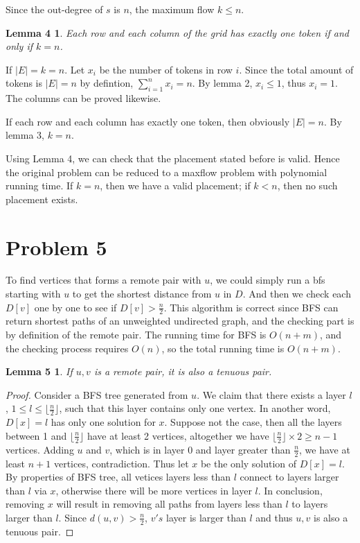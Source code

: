 \documentclass{report}
\def\floor#1{\lfloor{} #1 \rfloor{}}
\begin{document}
    Since the out-degree of $s$ is $n$, the maximum flow $k \le n$.
    \newtheorem*{l4}{Lemma 4}
    \begin{l4}
        Each row and each column of the grid has exactly one token if and only if $k = n$.
    \end{l4}
    If $|E| = k = n$. Let $x_i$ be the number of tokens in row $i$. Since the total amount
    of tokens is $|E| = n$ by defintion, $\sum_{i=1}^n x_i = n$. By lemma 2, $x_i \le 1$,
    thus $x_i = 1$. The columns can be proved likewise.

    If each row and each column has exactly one token, then obviously $|E| = n$. By lemma 3,
    $k = n$. 

    Using Lemma 4, we can check that the placement stated before is valid. Hence the 
    original problem can be reduced to a maxflow problem with polynomial running time.
    If $k = n$, then we have a valid placement; if $k < n$, then no such placement exists.

    \section*{Problem 5}
    To find vertices that forms a remote pair with $u$, we could simply run a bfs starting
    with $u$ to get the shortest distance from $u$ in $D$. And then we check each $D[v]$ 
    one by one to see if $D[v] > \frac{n}{2}$. This algorithm is correct since BFS can 
    return shortest paths of an unweighted undirected graph, and the checking part is by 
    definition of the remote pair. The running time for BFS is $O(n+m)$, and the checking 
    process requires $O(n)$, so the total running time is $O(n+m)$.

    \newtheorem*{l5}{Lemma 5}
    \begin{l5}
        If $u, v$ is a remote pair, it is also a tenuous pair.
    \end{l5}

    \begin{proof}
        Consider a BFS tree generated from $u$. We claim that there exists a layer $l$, 
        $1 \le l \le \floor{\frac{n}{2}}$, such that this layer contains only one vertex. 
        In another word, $D[x] = l$ has only one solution for $x$. Suppose not the case,
        then all the layers between 1 and $\floor{\frac{n}{2}}$ have at least 2 vertices, 
        altogether we have $\floor{\frac{n}{2}} \times 2 \ge n-1$ vertices. Adding $u$ and
        $v$, which is in layer 0 and layer greater than $\frac{n}{2}$,
        we have at least $n+1$ vertices, contradiction. Thus let $x$ be the only
        solution of $D[x] = l$. By properties of BFS tree, all vetices layers less than $l$ 
        connect to layers larger than $l$ via $x$, otherwise there will be more vertices in 
        layer $l$. In conclusion, removing $x$ will result in removing all paths from 
        layers less than $l$ to layers larger than $l$. Since $d(u, v) > \frac{n}{2}$,
        $v's$ layer is larger than $l$ and thus $u, v$ is also a tenuous pair.
    \end{proof}
\end{document}
